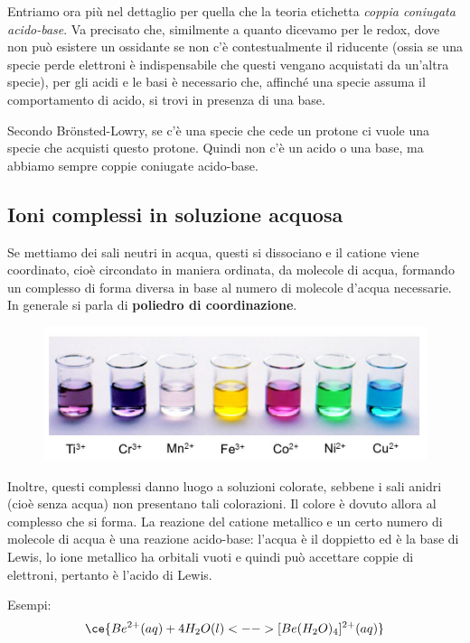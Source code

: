 Entriamo ora più nel dettaglio per quella che la teoria etichetta \textit{coppia coniugata acido-base}. Va precisato che, similmente a quanto dicevamo per le redox, dove non può esistere un ossidante se non c'è contestualmente il riducente (ossia se una specie perde elettroni è indispensabile che questi vengano acquistati da un'altra specie), per gli acidi e le basi è necessario che, affinché una specie assuma il comportamento di acido, si trovi in presenza di una base.

Secondo Br\"{o}nsted-Lowry, se c'è una specie che cede un protone ci vuole una specie che acquisti questo protone. Quindi non c'è un acido o una base, ma abbiamo sempre coppie coniugate acido-base.

\subsection{Ioni complessi in soluzione acquosa}
Se mettiamo dei sali neutri in acqua, questi si dissociano e il catione viene coordinato, cioè circondato in maniera ordinata, da molecole di acqua, formando un complesso di forma diversa in base al numero di molecole d'acqua necessarie. In generale si parla di \textbf{poliedro di coordinazione}.

\begin{figure}[htp]
    \centering
    \includegraphics[width=12cm]{immagini/ioni_complessi.png}
\end{figure}

Inoltre, questi complessi danno luogo a soluzioni colorate, sebbene i sali anidri (cioè senza acqua) non presentano tali colorazioni. Il colore è dovuto allora al complesso che si forma. La reazione del catione metallico e un certo numero di molecole di acqua è una reazione acido-base: l'acqua è il doppietto ed è la base di Lewis, lo ione metallico ha orbitali vuoti e quindi può accettare coppie di elettroni, pertanto è l'acido di Lewis.

\vspace{0.2cm}Esempi:
$$\ce{Be^{2+}(aq) + 4H_2O(l) <--> [Be(H_2O)_4]^{2+}(aq)}$$

